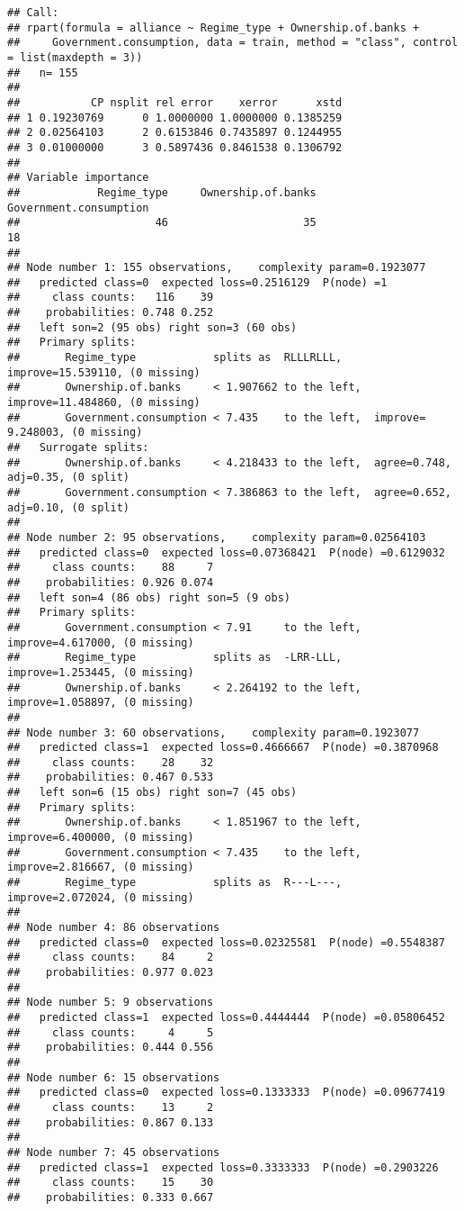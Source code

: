\documentclass[
]{article}
\begin{document}
\begin{verbatim}
## Call:
## rpart(formula = alliance ~ Regime_type + Ownership.of.banks + 
##     Government.consumption, data = train, method = "class", control = list(maxdepth = 3))
##   n= 155 
## 
##           CP nsplit rel error    xerror      xstd
## 1 0.19230769      0 1.0000000 1.0000000 0.1385259
## 2 0.02564103      2 0.6153846 0.7435897 0.1244955
## 3 0.01000000      3 0.5897436 0.8461538 0.1306792
## 
## Variable importance
##            Regime_type     Ownership.of.banks Government.consumption 
##                     46                     35                     18 
## 
## Node number 1: 155 observations,    complexity param=0.1923077
##   predicted class=0  expected loss=0.2516129  P(node) =1
##     class counts:   116    39
##    probabilities: 0.748 0.252 
##   left son=2 (95 obs) right son=3 (60 obs)
##   Primary splits:
##       Regime_type            splits as  RLLLRLLL,     improve=15.539110, (0 missing)
##       Ownership.of.banks     < 1.907662 to the left,  improve=11.484860, (0 missing)
##       Government.consumption < 7.435    to the left,  improve= 9.248003, (0 missing)
##   Surrogate splits:
##       Ownership.of.banks     < 4.218433 to the left,  agree=0.748, adj=0.35, (0 split)
##       Government.consumption < 7.386863 to the left,  agree=0.652, adj=0.10, (0 split)
## 
## Node number 2: 95 observations,    complexity param=0.02564103
##   predicted class=0  expected loss=0.07368421  P(node) =0.6129032
##     class counts:    88     7
##    probabilities: 0.926 0.074 
##   left son=4 (86 obs) right son=5 (9 obs)
##   Primary splits:
##       Government.consumption < 7.91     to the left,  improve=4.617000, (0 missing)
##       Regime_type            splits as  -LRR-LLL,     improve=1.253445, (0 missing)
##       Ownership.of.banks     < 2.264192 to the left,  improve=1.058897, (0 missing)
## 
## Node number 3: 60 observations,    complexity param=0.1923077
##   predicted class=1  expected loss=0.4666667  P(node) =0.3870968
##     class counts:    28    32
##    probabilities: 0.467 0.533 
##   left son=6 (15 obs) right son=7 (45 obs)
##   Primary splits:
##       Ownership.of.banks     < 1.851967 to the left,  improve=6.400000, (0 missing)
##       Government.consumption < 7.435    to the left,  improve=2.816667, (0 missing)
##       Regime_type            splits as  R---L---,     improve=2.072024, (0 missing)
## 
## Node number 4: 86 observations
##   predicted class=0  expected loss=0.02325581  P(node) =0.5548387
##     class counts:    84     2
##    probabilities: 0.977 0.023 
## 
## Node number 5: 9 observations
##   predicted class=1  expected loss=0.4444444  P(node) =0.05806452
##     class counts:     4     5
##    probabilities: 0.444 0.556 
## 
## Node number 6: 15 observations
##   predicted class=0  expected loss=0.1333333  P(node) =0.09677419
##     class counts:    13     2
##    probabilities: 0.867 0.133 
## 
## Node number 7: 45 observations
##   predicted class=1  expected loss=0.3333333  P(node) =0.2903226
##     class counts:    15    30
##    probabilities: 0.333 0.667
\end{verbatim}
\end{document}

